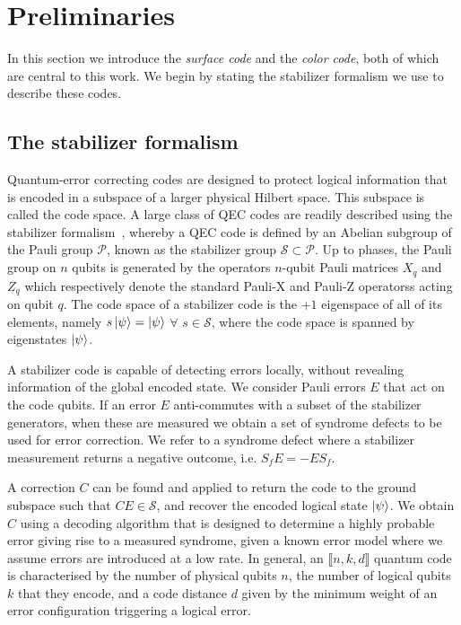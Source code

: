 \documentclass[a4paper,twocolumn,11pt,accepted=2024-12-23]{quantumarticle}
\begin{document}
\section{\label{sec:qec_codes} Preliminaries}


In this section we introduce the \textit{surface code} and the \textit{color code}, both of which are central to this work. We begin by stating the stabilizer formalism we use to describe these codes.


\subsection{The stabilizer formalism}

Quantum-error correcting codes are designed to protect logical information that is encoded in a subspace of a larger physical Hilbert space. This subspace is called the code space. A large class of QEC codes are readily described using the stabilizer formalism~\cite{Gottesman_1998}, whereby a QEC code is defined by an Abelian subgroup of the Pauli group $\mathcal{P}$, known as the stabilizer group $\mathcal{S} \subset \mathcal{P}$. 
Up to phases, the Pauli group on $n$ qubits is generated by the operators $n$-qubit Pauli matrices $X_q$ and $Z_q$ which respectively denote the standard Pauli-X and Pauli-Z operatorss acting on qubit $q$.
The code space of a stabilizer code is the +$1$ eigenspace of all of its elements, namely $s \ket{\psi} = \ket{\psi}$ $\forall$ $s \in \mathcal{S}$, where the code space is spanned by eigenstates $\ket{\psi}$. 

A stabilizer code is capable of detecting errors locally, without revealing information of the global encoded state. We consider Pauli errors $E$ that act on the code qubits. If an error $E$ anti-commutes with a subset of the stabilizer generators, when these are measured we obtain a set of syndrome defects to be used for error correction. We refer to a syndrome defect where a stabilizer measurement returns a negative outcome, i.e. $S_f E = - E S_f$. 


A correction $C$ can be found and applied to return the code to the ground subspace such that $CE\in\mathcal{S}$, and recover the encoded logical state $\ket{\psi}$. We obtain $C$ using a decoding algorithm that is designed to determine a highly probable error giving rise to a measured syndrome, given a known error model where we assume errors are introduced at a low rate.  
In general, an $\llbracket n,k,d \rrbracket$ quantum code is characterised by the number of physical qubits $n$, the number of logical qubits $k$ that they encode, and a code distance $d$ given by the minimum weight of an error configuration triggering a logical error. 
\end{document}

